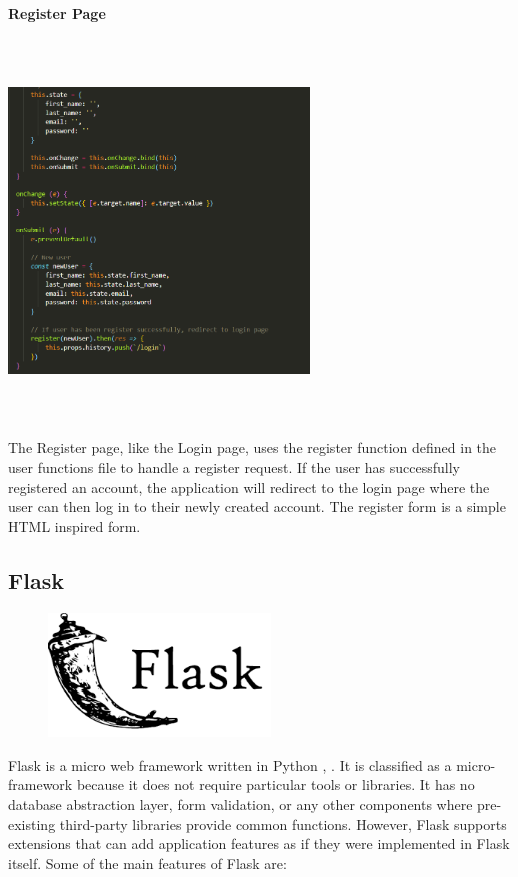 \newpage
\paragraph{Register Page}
\begin{center}
    \includegraphics[width=8cm,height=10cm,keepaspectratio]{images/register1}
\end{center}
The Register page, like the Login page, uses the register function defined in the user functions file to handle a register request. If the user has successfully registered an account, the application will redirect to the login page where the user can then log in to their newly created account. The register form is a simple HTML inspired form.

\newpage
\subsection{Flask}
\par
\medskip
\begin{center}
    \includegraphics[width=8cm,height=3.3cm,keepaspectratio]{images/flask}
\end{center}
Flask is a micro web framework written in Python \cite{flask_docs}, \cite{python_docs}. It is classified as a 
micro-framework because it does not require particular tools or libraries. It 
has no database abstraction layer, form validation, or any other components 
where pre-existing third-party libraries provide common functions. However, 
Flask supports extensions that can add application features as if they were 
implemented in Flask itself. Some of the main features of Flask are:

